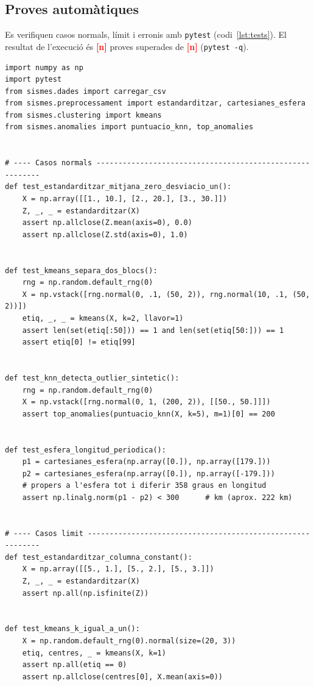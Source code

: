 \documentclass[11pt,a4paper]{article}
\newcommand{\pend}[1]{\textcolor{red}{\textbf{[#1]}}}
\begin{document}
\subsection{Proves automàtiques}\label{sec:proves}
Es verifiquen casos normals, límit i erronis amb \texttt{pytest}
(codi~\ref{lst:tests}). El resultat de l'execució és
\pend{n} proves superades de \pend{n} (\texttt{pytest -q}).

\begin{lstlisting}[caption={Proves automàtiques (\texttt{tests/test\_sismes.py}).},label={lst:tests}]
import numpy as np
import pytest
from sismes.dades import carregar_csv
from sismes.preprocessament import estandarditzar, cartesianes_esfera
from sismes.clustering import kmeans
from sismes.anomalies import puntuacio_knn, top_anomalies


# ---- Casos normals ---------------------------------------------------------
def test_estandarditzar_mitjana_zero_desviacio_un():
    X = np.array([[1., 10.], [2., 20.], [3., 30.]])
    Z, _, _ = estandarditzar(X)
    assert np.allclose(Z.mean(axis=0), 0.0)
    assert np.allclose(Z.std(axis=0), 1.0)


def test_kmeans_separa_dos_blocs():
    rng = np.random.default_rng(0)
    X = np.vstack([rng.normal(0, .1, (50, 2)), rng.normal(10, .1, (50, 2))])
    etiq, _, _ = kmeans(X, k=2, llavor=1)
    assert len(set(etiq[:50])) == 1 and len(set(etiq[50:])) == 1
    assert etiq[0] != etiq[99]


def test_knn_detecta_outlier_sintetic():
    rng = np.random.default_rng(0)
    X = np.vstack([rng.normal(0, 1, (200, 2)), [[50., 50.]]])
    assert top_anomalies(puntuacio_knn(X, k=5), m=1)[0] == 200


def test_esfera_longitud_periodica():
    p1 = cartesianes_esfera(np.array([0.]), np.array([179.]))
    p2 = cartesianes_esfera(np.array([0.]), np.array([-179.]))
    # propers a l'esfera tot i diferir 358 graus en longitud
    assert np.linalg.norm(p1 - p2) < 300      # km (aprox. 222 km)


# ---- Casos limit -----------------------------------------------------------
def test_estandarditzar_columna_constant():
    X = np.array([[5., 1.], [5., 2.], [5., 3.]])
    Z, _, _ = estandarditzar(X)
    assert np.all(np.isfinite(Z))


def test_kmeans_k_igual_a_un():
    X = np.random.default_rng(0).normal(size=(20, 3))
    etiq, centres, _ = kmeans(X, k=1)
    assert np.all(etiq == 0)
    assert np.allclose(centres[0], X.mean(axis=0))



\end{lstlisting}
\end{document}
